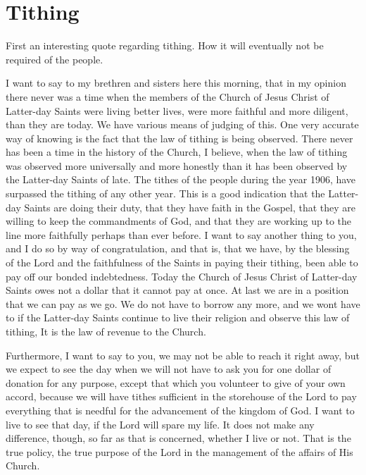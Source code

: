 \chapter{Tithing}

First an interesting quote regarding tithing. How it will eventually not be required
of the people.

\begin{displayquote}
I want to say to my brethren and sisters here this morning, that in my opinion there
never was a time when the members of the Church of Jesus Christ of Latter-day Saints
were living better lives, were more faithful and more diligent, than they are today.
We have various means of judging of this. One very accurate way of knowing is the
fact that the law of tithing is being observed. There never has been a time in the
history of the Church, I believe, when the law of tithing was observed more
universally and more honestly than it has been observed by the Latter-day Saints of
late. The tithes of the people during the year 1906, have surpassed the tithing of
any other year. This is a good indication that the Latter-day Saints are doing their
duty, that they have faith in the Gospel, that they are willing to keep the
commandments of God, and that they are working up to the line more faithfully perhaps
than ever before. I want to say another thing to you, and I do so by way of
congratulation, and that is, that we have, by the blessing of the Lord and the
faithfulness of the Saints in paying their tithing, been able to pay off our bonded
indebtedness. Today the Church of Jesus Christ of Latter-day Saints owes not a dollar
that it cannot pay at once. At last we are in a position that we can pay as we go. We
do not have to borrow any more, and we wont have to if the Latter-day Saints continue
to live their religion and observe this law of tithing, It is the law of revenue to
the Church.

Furthermore, I want to say to you, we may not be able to reach it right away, but we
expect to see the day when we will not have to ask you for one dollar of donation for
any purpose, except that which you volunteer to give of your own accord, because we
will have tithes sufficient in the storehouse of the Lord to pay everything that is
needful for the advancement of the kingdom of God. I want to live to see that day, if
the Lord will spare my life. It does not make any difference, though, so far as that
is concerned, whether I live or not. That is the true policy, the true purpose of the
Lord in the management of the affairs of His Church.


\end{displayquote}
